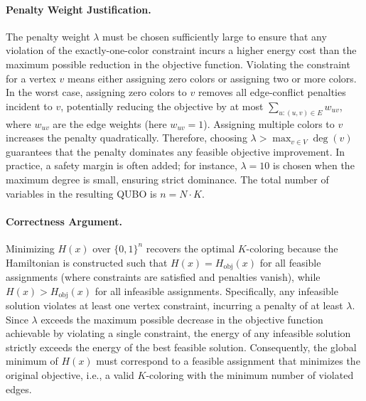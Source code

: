 \documentclass[12pt]{article}
\begin{document}
\paragraph{Penalty Weight Justification.}
The penalty weight $\lambda$ must be chosen sufficiently large to ensure that any violation of the exactly-one-color constraint incurs a higher energy cost than the maximum possible reduction in the objective function. Violating the constraint for a vertex $v$ means either assigning zero colors or assigning two or more colors. In the worst case, assigning zero colors to $v$ removes all edge-conflict penalties incident to $v$, potentially reducing the objective by at most $\sum_{u: (u,v) \in E} w_{uv}$, where $w_{uv}$ are the edge weights (here $w_{uv}=1$). Assigning multiple colors to $v$ increases the penalty quadratically. Therefore, choosing $\lambda > \max_{v \in V} \deg(v)$ guarantees that the penalty dominates any feasible objective improvement. In practice, a safety margin is often added; for instance, $\lambda = 10$ is chosen when the maximum degree is small, ensuring strict dominance. The total number of variables in the resulting QUBO is $n = N \cdot K$.

\paragraph{Correctness Argument.}
Minimizing $H(x)$ over $\{0,1\}^n$ recovers the optimal $K$-coloring because the Hamiltonian is constructed such that $H(x) = H_{\text{obj}}(x)$ for all feasible assignments (where constraints are satisfied and penalties vanish), while $H(x) > H_{\text{obj}}(x)$ for all infeasible assignments. Specifically, any infeasible solution violates at least one vertex constraint, incurring a penalty of at least $\lambda$. Since $\lambda$ exceeds the maximum possible decrease in the objective function achievable by violating a single constraint, the energy of any infeasible solution strictly exceeds the energy of the best feasible solution. Consequently, the global minimum of $H(x)$ must correspond to a feasible assignment that minimizes the original objective, i.e., a valid $K$-coloring with the minimum number of violated edges.
\end{document}
